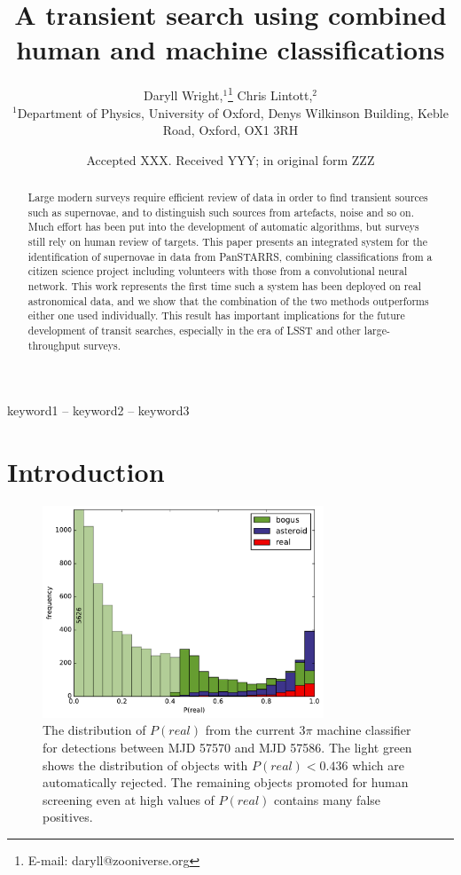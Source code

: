 \documentclass[a4paper,fleqn,usenatbib]{mnras}
\title[Human and machine classifications]{A transient search using combined human and machine classifications}
\author[D. Wright, C. Lintott et al.]{
Daryll Wright,$^{1}$\thanks{E-mail: daryll@zooniverse.org}
Chris Lintott,$^{2}$

$^{1}$Department of Physics, University of Oxford, Denys Wilkinson Building, Keble Road, Oxford, OX1 3RH
}
\date{Accepted XXX. Received YYY; in original form ZZZ}
\begin{document}
\label{firstpage}
\pagerange{\pageref{firstpage}--\pageref{lastpage}}
\maketitle

\begin{abstract}
Large modern surveys require efficient review of data in order to find transient sources such as supernovae, and to distinguish such sources from artefacts, noise and so on. Much effort has been put into the development of automatic algorithms, but surveys still rely on human review of targets. This paper presents an integrated system for the identification of supernovae in data from PanSTARRS, combining classifications from a citizen science project including volunteers with those from a convolutional neural network. This work represents the first time such a system has been deployed on real astronomical data, and we show that the combination of the two methods outperforms either one used individually. This result has important implications for the future development of transit searches, especially in the era of LSST and other large-throughput surveys. 
\end{abstract}

\begin{keywords}
keyword1 -- keyword2 -- keyword3
\end{keywords}



\section{Introduction}


\begin{figure}
   \includegraphics[width=84mm]{figs/machine_hist.pdf}
   \caption{The distribution of $P(real)$ from the current 3$\pi$ machine classifier 
            for detections between MJD 57570 and MJD 57586.  The light green shows the distribution of 
            objects with $P(real) < 0.436$ which are automatically rejected.  The remaining 
            objects promoted for human screening even at high values of $P(real)$ contains
            many false positives.} 
   \label{fig:machine_dist} 
\end{figure}
\end{document}
